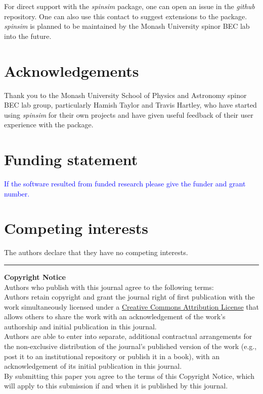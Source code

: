 \documentclass{jors}
\begin{document}
		For direct support with the \emph{spinsim} package, one can open an issue in the \emph{github} repository.
		One can also use this contact to suggest extensions to the package.
		\emph{spinsim} is planned to be maintained by the Monash University spinor BEC lab into the future.

\section{Acknowledgements}

Thank you to the Monash University School of Physics and Astronomy spinor BEC lab group, particularly Hamish Taylor and Travis Hartley, who have started using \emph{spinsim} for their own projects and have given useful feedback of their user experience with the package.

\section{Funding statement}

\textcolor{blue}{If the software resulted from funded research please give the funder and grant number.}

\section{Competing interests}

The authors declare that they have no competing interests.

{}


\vspace{2cm}

\rule{\textwidth}{1pt}

{ \bf Copyright Notice} \\
Authors who publish with this journal agree to the following terms: \\

Authors retain copyright and grant the journal right of first publication with the work simultaneously licensed under a  \href{http://creativecommons.org/licenses/by/3.0/}{Creative Commons Attribution License} that allows others to share the work with an acknowledgement of the work's authorship and initial publication in this journal. \\

Authors are able to enter into separate, additional contractual arrangements for the non-exclusive distribution of the journal's published version of the work (e.g., post it to an institutional repository or publish it in a book), with an acknowledgement of its initial publication in this journal. \\

By submitting this paper you agree to the terms of this Copyright Notice, which will apply to this submission if and when it is published by this journal.
\end{document}
